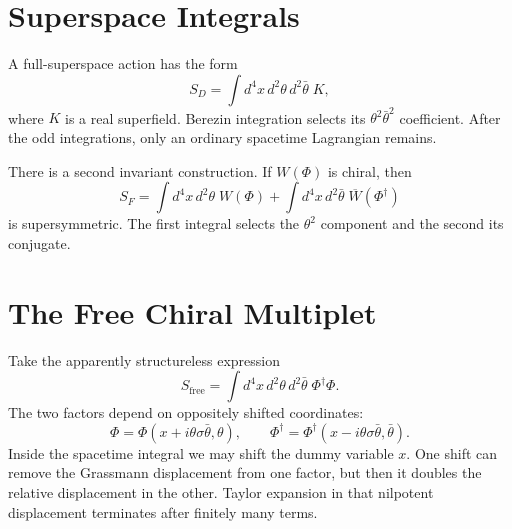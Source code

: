\section{Superspace Integrals}

A full-superspace action has the form
\begin{equation}
S_D=\int d^4x\,d^2\theta\,d^2\bar\theta\;K,
\label{eq:l8-D-term-action}
\end{equation}
where \(K\) is a real superfield. Berezin integration selects its
\(\theta^2\bar\theta^2\) coefficient. After the odd integrations, only an ordinary spacetime Lagrangian remains.

There is a second invariant construction. If \(W(\Phi)\) is chiral, then
\begin{equation}
S_F=\int d^4x\,d^2\theta\;W(\Phi)
+\int d^4x\,d^2\bar\theta\;\overline{W}(\Phi^\dagger)
\label{eq:l8-F-term-action}
\end{equation}
is supersymmetric. The first integral selects the \(\theta^2\) component and the second its conjugate.

\begin{classroomqa}
\end{classroomqa}

\section{The Free Chiral Multiplet}

Take the apparently structureless expression
\begin{equation}
S_{\mathrm{free}}
=\int d^4x\,d^2\theta\,d^2\bar\theta\;
\Phi^\dagger\Phi.
\label{eq:l8-free-superaction}
\end{equation}
The two factors depend on oppositely shifted coordinates:
\begin{equation}
\Phi=\Phi(x+i\theta\sigma\bar\theta,\theta),
\qquad
\Phi^\dagger
=\Phi^\dagger(x-i\theta\sigma\bar\theta,\bar\theta).
\end{equation}
Inside the spacetime integral we may shift the dummy variable \(x\). One shift can remove the Grassmann displacement from one factor, but then it doubles the relative displacement in the other. Taylor expansion in that nilpotent displacement terminates after finitely many terms.

